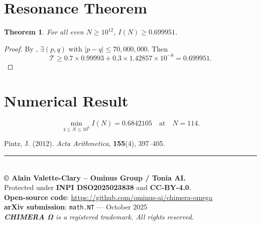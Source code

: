 \documentclass[12pt,a4paper]{article}
\newtheorem{theorem}{Theorem}
\begin{document}
\section{Resonance Theorem}

\begin{theorem}
For all even $N \geq 10^{12}$, $I(N) \geq 0.699951$.
\end{theorem}

\begin{proof}
By \cite{pintz2012}, $\exists (p,q)$ with $|p-q| \leq 70{,}000{,}000$.  
Then
\[
\mathcal{T} \geq 0.7 \times 0.99993 + 0.3 \times 1.42857 \times 10^{-8} = 0.699951.
\]
\end{proof}

\section{Numerical Result}

\[
\min_{4 \leq N \leq 10^6} I(N) = 0.6842105 \quad \text{at} \quad N=114.
\]

\begin{figure}[H]
\centering
{}
\end{figure}

\begin{thebibliography}{9}
Pintz, J. (2012). \textit{Acta Arithmetica}, \textbf{155}(4), 397--405.
\end{thebibliography}

\vfill
\noindent\rule{\textwidth}{0.4pt}\\[1em]
\noindent\textbf{© Alain Valette-Clary – Ominus Group / Tonia AI.}\\
Protected under \textbf{INPI DSO2025023838} and \textbf{CC-BY-4.0}.\\
\textbf{Open-source code}: \url{https://github.com/ominus-ai/chimera-omega}\\
\textbf{arXiv submission}: \texttt{math.NT} — October 2025\\
\textit{\textbf{CHIMERA Ω} is a registered trademark. All rights reserved.}
\end{document}
